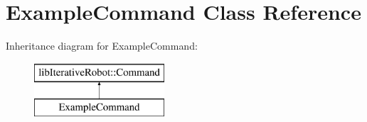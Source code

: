 \hypertarget{class_example_command}{}\section{Example\+Command Class Reference}
\label{class_example_command}
Inheritance diagram for Example\+Command\+:\begin{figure}[H]
\begin{center}
\leavevmode
\includegraphics[height=2.000000cm]{class_example_command}
\end{center}
\end{figure}

